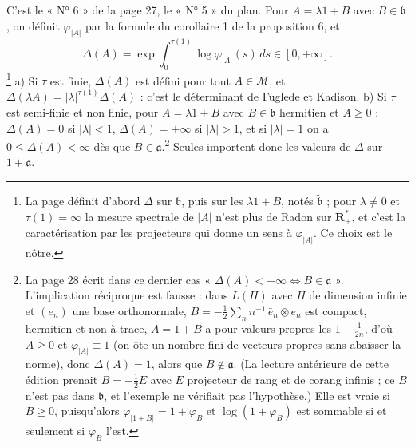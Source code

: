 \documentclass[11pt,a4paper]{article}
\begin{document}
C'est le « N° 6 » de la page 27, le « N° 5 » du plan. Pour $A = \lambda 1 + B$
avec $B \in \mathfrak{b}$, on définit $\varphi_{|A|}$ par la formule du
corollaire 1 de la proposition 6, et
\[
  \Delta(A) = \exp\int_0^{\tau(1)} \log\varphi_{|A|}(s)\,ds \in [0, +\infty] .
\]
\footnote{La page définit d'abord $\Delta$ sur $\mathfrak{b}$, puis sur les
$\lambda 1 + B$, notés $\tilde{\mathfrak{b}}$ ; pour $\lambda \neq 0$ et
$\tau(1) = \infty$ la mesure spectrale de $|A|$ n'est plus de Radon sur
$\mathbf{R}^{*}_{+}$, et c'est la caractérisation par les projecteurs qui
donne un sens à $\varphi_{|A|}$. Ce choix est le nôtre.}
a) Si $\tau$ est finie, $\Delta(A)$ est défini pour tout $A \in \mathcal{M}$,
et $\Delta(\lambda A) = |\lambda|^{\tau(1)}\Delta(A)$ : c'est le déterminant
de Fuglede et Kadison.
b) Si $\tau$ est semi-finie et non finie, pour $A = \lambda 1 + B$ avec
$B \in \mathfrak{b}$ hermitien et $A \geq 0$ : $\Delta(A) = 0$ si
$|\lambda| < 1$, $\Delta(A) = +\infty$ si $|\lambda| > 1$, et si
$|\lambda| = 1$ on a $0 \leq \Delta(A) < \infty$ dès que $B \in
\mathfrak{a}$.\footnote{La page 28 écrit dans ce dernier cas « $\Delta(A) <
+\infty \Longleftrightarrow B \in \mathfrak{a}$ ». L'implication réciproque
est fausse : dans $L(H)$ avec $H$ de dimension infinie et $(e_n)$ une base
orthonormale, $B = -\frac12 \sum_n n^{-1}\,\bar e_n \otimes e_n$ est compact,
hermitien et non à trace, $A = 1 + B$ a pour valeurs propres les $1 -
\frac1{2n}$, d'où $A \geq 0$ et $\varphi_{|A|} \equiv 1$ (on ôte un nombre
fini de vecteurs propres sans abaisser la norme), donc $\Delta(A) = 1$, alors
que $B \notin \mathfrak{a}$. (La lecture antérieure de cette édition prenait
$B = -\frac12 E$ avec $E$ projecteur de rang et de corang infinis ; ce $B$
n'est pas dans $\mathfrak{b}$, et l'exemple ne vérifiait pas l'hypothèse.)
Elle est
vraie si $B \geq 0$, puisqu'alors $\varphi_{|1+B|} = 1 + \varphi_B$ et
$\log(1+\varphi_B)$ est sommable si et seulement si $\varphi_B$ l'est.}
Seules importent donc les valeurs de $\Delta$ sur $1 + \mathfrak{a}$.
\end{document}
